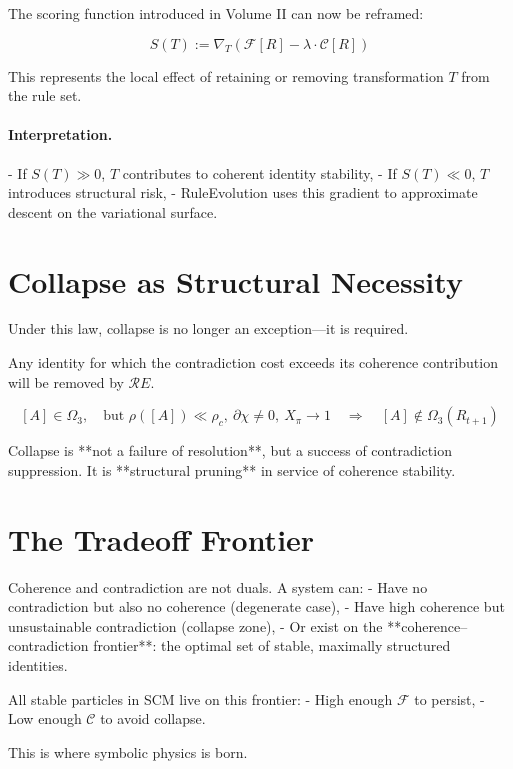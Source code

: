 The scoring function introduced in Volume II can now be reframed:

\begin{equation} \label{eq:score-gradient}
S(T) := \nabla_T \left( \mathcal{F}[R] - \lambda \cdot \mathcal{C}[R] \right)
\end{equation}

This represents the local effect of retaining or removing transformation $T$ from the rule set.

\paragraph{Interpretation.}
- If $S(T) \gg 0$, $T$ contributes to coherent identity stability,
- If $S(T) \ll 0$, $T$ introduces structural risk,
- RuleEvolution uses this gradient to approximate descent on the variational surface.

\section{Collapse as Structural Necessity} \label{sec:collapse-necessity}

Under this law, collapse is no longer an exception—it is required.

Any identity for which the contradiction cost exceeds its coherence contribution will be removed by $\mathcal{R}E$.

\[
[A] \in \Omega_3,\quad \text{but } \rho([A]) \ll \rho_c,\ \partial\chi \ne 0,\ X_\pi \to 1
\quad \Rightarrow \quad [A] \notin \Omega_3(R_{t+1})
\]

Collapse is **not a failure of resolution**, but a success of contradiction suppression. It is **structural pruning** in service of coherence stability.

\section{The Tradeoff Frontier} \label{sec:tradeoff-frontier}

Coherence and contradiction are not duals. A system can:
- Have no contradiction but also no coherence (degenerate case),
- Have high coherence but unsustainable contradiction (collapse zone),
- Or exist on the **coherence–contradiction frontier**: the optimal set of stable, maximally structured identities.

All stable particles in SCM live on this frontier:
- High enough $\mathcal{F}$ to persist,
- Low enough $\mathcal{C}$ to avoid collapse.

This is where symbolic physics is born.

